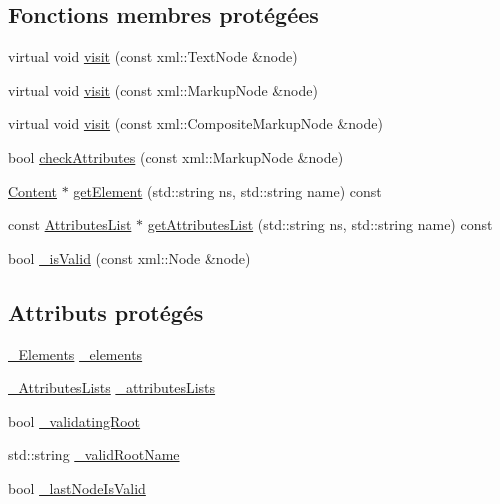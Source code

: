 \subsection*{Fonctions membres protégées}
\begin{DoxyCompactItemize}
\item 
virtual void \hyperlink{classdtd_1_1_d_t_d_afa42d6567898ce96adf1b31b1da235e8}{visit} (const xml::TextNode \&node)
\item 
virtual void \hyperlink{classdtd_1_1_d_t_d_a7b21ffe9e0af0c815abedde305f0c241}{visit} (const xml::MarkupNode \&node)
\item 
virtual void \hyperlink{classdtd_1_1_d_t_d_a46680bf029f0728fa10bb0568017f4ce}{visit} (const xml::CompositeMarkupNode \&node)
\item 
bool \hyperlink{classdtd_1_1_d_t_d_a65a0b095665ae232ef40f1b9aad50387}{checkAttributes} (const xml::MarkupNode \&node)
\item 
\hyperlink{classdtd_1_1_content}{Content} $\ast$ \hyperlink{classdtd_1_1_d_t_d_ab1d76ad625a6fd3b64a4306cdc14400c}{getElement} (std::string ns, std::string name) const 
\item 
const \hyperlink{namespacedtd_a8d5d29abb5de0468925f321597f57f4b}{AttributesList} $\ast$ \hyperlink{classdtd_1_1_d_t_d_a531a239b85845e41a0422c6a60e59f63}{getAttributesList} (std::string ns, std::string name) const 
\item 
bool \hyperlink{classdtd_1_1_d_t_d_a88b9e78103312ed1a7be0f644571606f}{\_\-isValid} (const xml::Node \&node)
\end{DoxyCompactItemize}
\subsection*{Attributs protégés}
\begin{DoxyCompactItemize}
\item 
\hyperlink{classdtd_1_1_d_t_d_a3acb9bcea95d9ad98d14b7851b6151c1}{\_\-Elements} \hyperlink{classdtd_1_1_d_t_d_ab28c987860b12e12e5b9e3c199b4a4fd}{\_\-elements}
\item 
\hyperlink{classdtd_1_1_d_t_d_ad0c96201d399a44b597764334d343752}{\_\-AttributesLists} \hyperlink{classdtd_1_1_d_t_d_aec11a99c5e351b44bbdef249500bb1ac}{\_\-attributesLists}
\item 
bool \hyperlink{classdtd_1_1_d_t_d_acd1f91b37ce5dd73597f880c08546d40}{\_\-validatingRoot}
\item 
std::string \hyperlink{classdtd_1_1_d_t_d_ae2c393aa68abc63e9c5afe34770a75f5}{\_\-validRootName}
\item 
bool \hyperlink{classdtd_1_1_d_t_d_a1d27a4c5f57f3eac45bba4207fb0fa2e}{\_\-lastNodeIsValid}
\end{DoxyCompactItemize}


